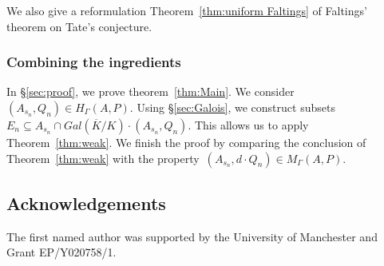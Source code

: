 \documentclass[12pt]{amsart}
\newcommand{\ol}{\overline}
\begin{document}
We also give a reformulation Theorem~\ref{thm:uniform Faltings} of Faltings' theorem on Tate's conjecture.

\subsubsection{Combining the ingredients} In \S\ref{sec:proof}, we prove theorem~\ref{thm:Main}. We consider~$(A_{s_n},Q_n)\in H_\Gamma(A,P)$. Using \S\ref{sec:Galois}, we construct subsets~$E_n\subseteq A_{s_n}\cap Gal(\ol{K}/K)\cdot (A_{s_n},Q_n)$. This allows us to apply Theorem~\ref{thm:weak}. We finish the proof by comparing the conclusion of Theorem~\ref{thm:weak} with the property~$(A_{s_n},d\cdot Q_n)\in M_\Gamma(A,P)$.

\subsection{Acknowledgements}The first named author was supported by the University of Manchester and Grant EP/Y020758/1.
\end{document}

